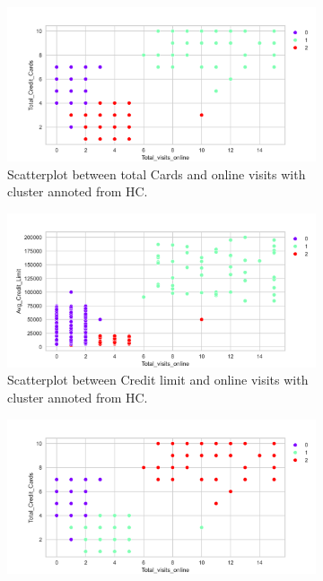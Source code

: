 \documentclass[10pt,a4paper]{style}
\begin{document}
		
		\begin{figure}[h]
			\centering
			\begin{subfigure}[t]{0.49\textwidth}
				\includegraphics[width=\textwidth]{cluster_vis_cards_vs_online_visits_HC.png}
				\caption{Scatterplot between total Cards and online visits with cluster annoted from HC.}
				\label{fig:cluster_vis_cards_vs_online_visits_HC}
			\end{subfigure}
			\hfill
			\begin{subfigure}[t]{0.49\textwidth}
				\includegraphics[width=\textwidth]{cluster_vis_credit_vs_online_visit_HC.png}
				\caption{Scatterplot between Credit limit and online visits with cluster annoted from HC.}
				\label{fig:cluster_vis_credit_vs_online_visit_HCg}
			\end{subfigure}
			\begin{subfigure}[t]{0.49\textwidth}
				\includegraphics[width=\textwidth]{cluster_vis_cards_vs_online_visits_KM.png}

\end{subfigure}
\end{figure}
\end{document}
